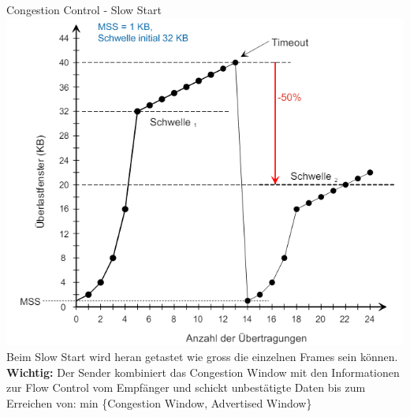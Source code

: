 \begin{concept}{Congestion Control - Slow Start}\\
    \includegraphics[width=0.75\linewidth]{images/congestion_control.png}\\
    Beim Slow Start wird heran getastet wie gross die einzelnen Frames sein können.\\
    \textbf{Wichtig:} Der Sender kombiniert das Congestion Window mit den Informationen zur Flow Control vom Empfänger und schickt unbestätigte Daten bis zum Erreichen von: min \{Congestion Window, Advertised Window\}
\end{concept}

